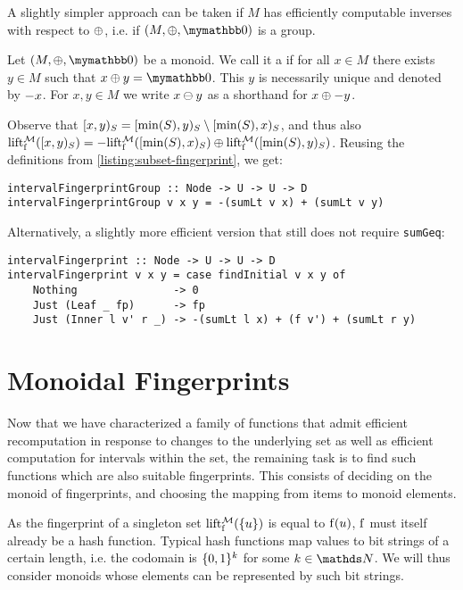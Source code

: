 A slightly simpler approach can be taken if $M$ has efficiently computable inverses with respect to $\oplus$, i.e. if $(M, \groupaddsym, \neutraladd)$ is a group.

\begin{definition}
Let $(M, \groupaddsym, \neutraladd)$ be a monoid.
We call it a  if for all $x \in M$ there exists $y \in M$ such that $\groupadd{x}{y} = \neutraladd$.
This $y$ is necessarily unique and denoted by $-{x}$.
For $x, y \in M$ we write ${x} \ominus {y}$ as a shorthand for ${x} \oplus {-{y}}$.
\end{definition}

Observe that $[{x},{y})_{S} = [{\min(S)},{y})_{S} \setminus [{\min(S)},{x})_{S}$, and thus also $\operatorname{lift_{\operatorname{f}}^{\mathcal{M}}}([{x},{y})_{S}) = {-{\operatorname{lift_{\operatorname{f}}^{\mathcal{M}}}([{\min(S)},{x})_{S})}} \oplus {\operatorname{lift_{\operatorname{f}}^{\mathcal{M}}}([{\min(S)},{y})_{S})}$. Reusing the definitions from \cref{listing:subset-fingerprint}, we get:

\begin{verbatim}
intervalFingerprintGroup :: Node -> U -> U -> D
intervalFingerprintGroup v x y = -(sumLt v x) + (sumLt v y)
\end{verbatim}

Alternatively, a slightly more efficient version that still does not require \texttt{sumGeq}:

\begin{verbatim}
intervalFingerprint :: Node -> U -> U -> D
intervalFingerprint v x y = case findInitial v x y of
    Nothing               -> 0
    Just (Leaf _ fp)      -> fp
    Just (Inner l v' r _) -> -(sumLt l x) + (f v') + (sumLt r y)
\end{verbatim}

\section{Monoidal Fingerprints}
\label{collisions}

Now that we have characterized a family of functions that admit efficient recomputation in response to changes to the underlying set as well as efficient computation for intervals within the set, the remaining task is to find such functions which are also suitable fingerprints. This consists of deciding on the monoid of fingerprints, and choosing the mapping from items to monoid elements.

As the fingerprint of a singleton set $\operatorname{lift_{\operatorname{f}}^{\mathcal{M}}}(\{u\})$ is equal to $\operatorname{f}(u)$, $\operatorname{f}$ must itself already be a hash function. Typical hash functions map values to bit strings of a certain length, i.e. the codomain is $\{0, 1\}^k$ for some $k \in \N$. We will thus consider monoids whose elements can be represented by such bit strings.

